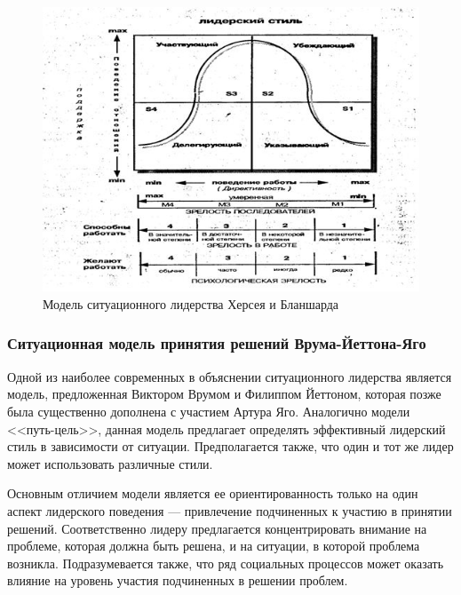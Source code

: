 \documentclass[a4paper,12pt,oneside,final]{extarticle}
\makeatletter
\numberwithin{equation}{section}
\def\maxwidth#1{\ifdim\Gin@nat@width>#1 #1\else\Gin@nat@width\fi}
\makeatother
\begin{document}
\begin{figure}[h]
	\centering
	\includegraphics[width=\maxwidth{\textwidth}]{management-figures/leadership_hb}
	\caption{Модель ситуационного лидерства Херсея и Бланшарда}
\end{figure}

\subsubsection{Ситуационная модель принятия решений Врума-Йеттона-Яго}
Одной из наиболее современных в объяснении ситуационного лидерства является модель, предложенная Виктором Врумом и Филиппом Йеттоном, которая позже была существенно дополнена с участием Артура Яго. 
Аналогично модели <<путь-цель>>, данная модель предлагает определять эффективный лидерский стиль в зависимости от ситуации. 
Предполагается также, что один и тот же лидер может использовать различные стили. 

Основным отличием модели является ее ориентированность только на один аспект лидерского поведения --- привлечение подчиненных к участию в принятии решений.
Соответственно лидеру предлагается концентрировать внимание на проблеме, которая должна быть решена, и на ситуации, в которой проблема возникла.
Подразумевается также, что ряд социальных процессов может оказать влияние на уровень участия подчиненных в решении проблем.
\end{document}
